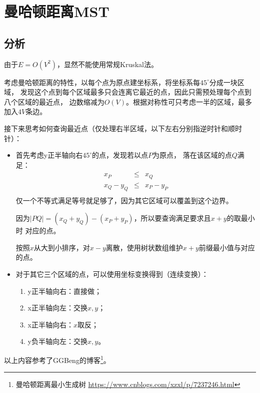 \section{曼哈顿距离MST}
\subsection{分析}
由于$E=O(V^2)$，显然不能使用常规Kruskal法。

考虑曼哈顿距离的特性，以每个点为原点建坐标系，将坐标系每$45^\circ$分成一块区域，
发现这个点到每个区域最多只会连离它最近的点，因此只需预处理每个点到八个区域的最近点，
边数缩减为$O(V)$。根据对称性可只考虑一半的区域，最多加入$4V$条边。

接下来思考如何查询最近点（仅处理右半区域，以下左右分别指逆时针和顺时针）：

\begin{itemize}
	\item 首先考虑y正半轴向右$45^\circ$的点，发现若以点$P$为原点，
	      落在该区域的点$Q$满足：
	      \begin{eqnarray*}
		      x_P&\leq& x_Q\\
		      x_Q-y_Q&\leq& x_P-y_P\\
	      \end{eqnarray*}
	      仅一个不等式满足等号就足够了，因为其它区域可以覆盖到这个边界。

	      因为$|PQ|=(x_Q+y_Q)-(x_P+y_P)$，所以要查询满足要求且$x+y$的取最小时
	      对应的点。

	      按照$x$从大到小排序，对$x-y$离散，使用树状数组维护$x+y$前缀最小值与对应的点。
	\item 对于其它三个区域的点，可以使用坐标变换得到（连续变换）：
	      \begin{enumerate}
		      \item y正半轴向右：直接做；
		      \item x正半轴向左：交换$x,y$；
		      \item x正半轴向右：$x$取反；
		      \item y负半轴向左：交换$x,y$。
	      \end{enumerate}
\end{itemize}

以上内容参考了GGBeng的博客\footnote{曼哈顿距离最小生成树
	\url{https://www.cnblogs.com/xzxl/p/7237246.html}
}。
